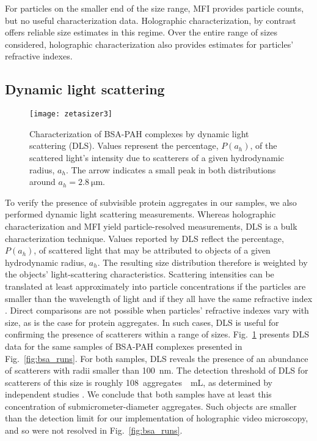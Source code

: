 For particles on the smaller end of the size range, MFI provides particle counts, but no 
useful characterization data. Holographic characterization, by contrast offers reliable 
size estimates in this regime. Over the entire range of sizes considered, holographic 
characterization also provides estimates for particles’ refractive indexes.

\subsection{Dynamic light scattering}

\begin{figure}[!t]
  \centering
  \texttt{[image: zetasizer3]}
	\caption[Dynamic light scattering results]
    {Characterization of BSA-PAH complexes by dynamic light scattering (DLS). Values 
    represent the percentage, $P(a_h)$, of the scattered light’s intensity due to 
    scatterers of a given hydrodynamic radius, $a_h$. The arrow indicates a small peak in 
    both distributions around $a_h = \SI{2.8}{\um}$.}
	\label{fig:zetasizer}
\end{figure}

To verify the presence of subvisible protein aggregates in our samples, we also performed 
dynamic light scattering measurements. Whereas holographic characterization and MFI yield 
particle-resolved measurements, DLS is a bulk characterization technique. Values reported 
by DLS reflect the percentage, $P(a_h)$, of scattered light that may be attributed to 
objects of a given hydrodynamic radius, $a_h$. The resulting size distribution therefore 
is weighted by the objects’ light-scattering characteristics. Scattering intensities can 
be translated at least approximately into particle concentrations if the particles are 
smaller than the wavelength of light and if they all have the same refractive index 
\cite{berne00}. Direct comparisons are not possible when particles’ refractive indexes 
vary with size, as is the case for protein aggregates. In such cases, DLS is useful for 
confirming the presence of scatterers within a range of sizes. Fig.~\ref{fig:zetasizer} 
presents DLS data for the same samples of BSA-PAH complexes presented in
Fig.~\ref{fig:bsa_runs}. For both samples, DLS reveals the presence of an abundance of 
scatterers with radii smaller than \SI{100}{\nm}. The detection threshold of DLS for 
scatterers of this size is roughly \SI{108}{aggregates \per \mL}, as determined by 
independent studies \cite{panchal14}. We conclude that both samples have at least this 
concentration of submicrometer-diameter aggregates. Such objects are smaller than the 
detection limit for our implementation of holographic video microscopy, and so were not 
resolved in Fig.~\ref{fig:bsa_runs}.

